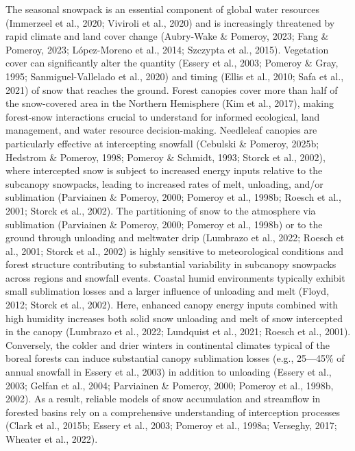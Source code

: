 \documentclass[
  letterpaper,
]{tex/uofsthesis-cs}
\begin{document}
The seasonal snowpack is an essential component of global water
resources (Immerzeel et al., 2020; Viviroli et al., 2020) and is
increasingly threatened by rapid climate and land cover change
(Aubry-Wake \& Pomeroy, 2023; Fang \& Pomeroy, 2023; López-Moreno et
al., 2014; Szczypta et al., 2015). Vegetation cover can significantly
alter the quantity (Essery et al., 2003; Pomeroy \& Gray, 1995;
Sanmiguel-Vallelado et al., 2020) and timing (Ellis et al., 2010; Safa
et al., 2021) of snow that reaches the ground. Forest canopies cover
more than half of the snow-covered area in the Northern Hemisphere (Kim
et al., 2017), making forest-snow interactions crucial to understand for
informed ecological, land management, and water resource
decision-making. Needleleaf canopies are particularly effective at
intercepting snowfall (Cebulski \& Pomeroy, 2025b; Hedstrom \& Pomeroy,
1998; Pomeroy \& Schmidt, 1993; Storck et al., 2002), where intercepted
snow is subject to increased energy inputs relative to the subcanopy
snowpacks, leading to increased rates of melt, unloading, and/or
sublimation (Parviainen \& Pomeroy, 2000; Pomeroy et al., 1998b; Roesch
et al., 2001; Storck et al., 2002). The partitioning of snow to the
atmosphere via sublimation (Parviainen \& Pomeroy, 2000; Pomeroy et al.,
1998b) or to the ground through unloading and meltwater drip (Lumbrazo
et al., 2022; Roesch et al., 2001; Storck et al., 2002) is highly
sensitive to meteorological conditions and forest structure contributing
to substantial variability in subcanopy snowpacks across regions and
snowfall events. Coastal humid environments typically exhibit small
sublimation losses and a larger influence of unloading and melt (Floyd,
2012; Storck et al., 2002). Here, enhanced canopy energy inputs combined
with high humidity increases both solid snow unloading and melt of snow
intercepted in the canopy (Lumbrazo et al., 2022; Lundquist et al.,
2021; Roesch et al., 2001). Conversely, the colder and drier winters in
continental climates typical of the boreal forests can induce
substantial canopy sublimation losses (e.g., 25---45\% of annual
snowfall in Essery et al., 2003) in addition to unloading (Essery et
al., 2003; Gelfan et al., 2004; Parviainen \& Pomeroy, 2000; Pomeroy et
al., 1998b, 2002). As a result, reliable models of snow accumulation and
streamflow in forested basins rely on a comprehensive understanding of
interception processes (Clark et al., 2015b; Essery et al., 2003;
Pomeroy et al., 1998a; Verseghy, 2017; Wheater et al., 2022).
\end{document}
